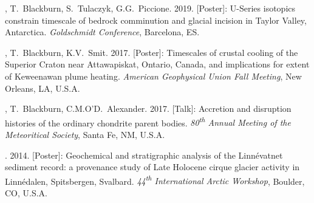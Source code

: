 \begin{etaremune} [itemsep=4pt, leftmargin=3ex]
  \item  \ghedwards, T.~Blackburn, S.~Tulaczyk, G.G.~Piccione. 2019. [Poster]: U-Series isotopics constrain timescale of bedrock comminution and glacial incision in Taylor Valley, Antarctica. \textit{Goldschmidt Conference}, Barcelona, ES.

  \item \ghedwards, T.~Blackburn, K.V.~Smit. 2017. [Poster]: Timescales of crustal cooling of the Superior Craton near Attawapiskat, Ontario, Canada, and implications for extent of Keweenawan plume heating. \textit{American Geophysical Union Fall Meeting}, New Orleans, LA, U.S.A.

  \item  \ghedwards, T.~Blackburn, C.M.O’D.~Alexander. 2017. [Talk]: Accretion and disruption histories of the ordinary chondrite parent bodies. \textit{80\textsuperscript{th} Annual Meeting of the Meteoritical Society}, Santa Fe, NM, U.S.A.

  \item \ghedwards. 2014. [Poster]: Geochemical and stratigraphic analysis of the Linnévatnet sediment record: a provenance study of Late Holocene cirque glacier activity in Linnédalen, Spitsbergen, Svalbard. \textit{44\textsuperscript{th} International Arctic Workshop}, Boulder, CO, U.S.A.
\end{etaremune}


 


